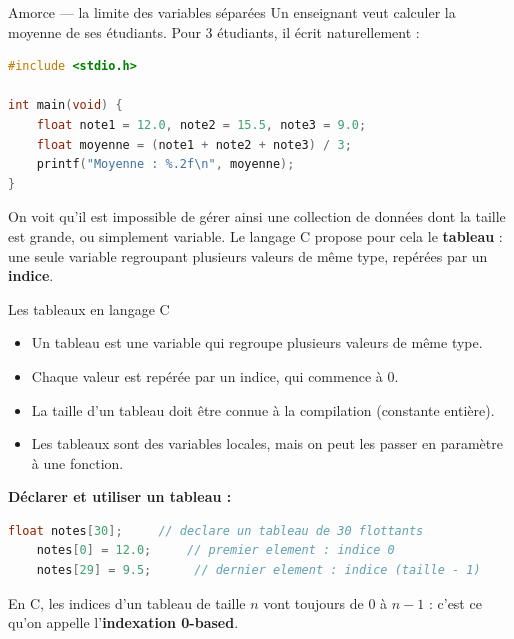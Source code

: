 \begin{UPSTIexercice}{Amorce — la limite des variables séparées}
    Un enseignant veut calculer la moyenne de ses étudiants. Pour 3 étudiants, il écrit naturellement :
    \begin{lstlisting}[language=C]
#include <stdio.h>

int main(void) {
    float note1 = 12.0, note2 = 15.5, note3 = 9.0;
    float moyenne = (note1 + note2 + note3) / 3;
    printf("Moyenne : %.2f\n", moyenne);
}
    \end{lstlisting}

\end{UPSTIexercice}

On voit qu'il est impossible de gérer ainsi une collection de données dont la taille est grande, ou simplement variable. Le langage C propose pour cela le \textbf{tableau} : une seule variable regroupant plusieurs valeurs de même type, repérées par un \textbf{indice}.
\begin{UPSTIinfor}{Les tableaux en langage C}
    \begin{itemize}
        \item Un tableau est une variable qui regroupe plusieurs valeurs de même type.
        \item Chaque valeur est repérée par un indice, qui commence à 0.
        \item La taille d'un tableau doit être connue à la compilation (constante entière).
        \item Les tableaux sont des variables locales, mais on peut les passer en paramètre à une fonction.
    \end{itemize}
    
    \textbf{Déclarer et utiliser un tableau :}
    \begin{lstlisting}[language=C]
    float notes[30];     // declare un tableau de 30 flottants
    notes[0] = 12.0;     // premier element : indice 0
    notes[29] = 9.5;      // dernier element : indice (taille - 1)
    \end{lstlisting}
    En C, les indices d'un tableau de taille $n$ vont toujours de $0$ à $n-1$ : c'est ce qu'on appelle l'\textbf{indexation 0-based}.
\end{UPSTIinfor}


